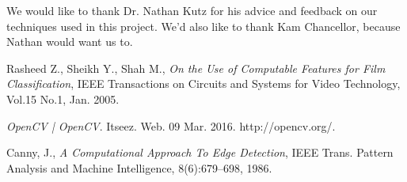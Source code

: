 \documentclass[letterpaper, 10 pt, conference]{ieeeconf}  %
\begin{document}
We would like to thank Dr. Nathan Kutz for his advice and feedback on our techniques used in this project. We'd also like to thank Kam Chancellor, because Nathan would want us to.


\begin{thebibliography}{99}
Rasheed Z., Sheikh Y., Shah M., {\it On the Use of Computable Features for Film Classification}, IEEE Transactions on Circuits and Systems for Video Technology, Vol.15 No.1, Jan. 2005.

{\it OpenCV | OpenCV}. Itseez. Web. 09 Mar. 2016. http://opencv.org/.

Canny, J., {\it A Computational Approach To Edge Detection}, IEEE Trans. Pattern Analysis and Machine Intelligence, 8(6):679–698, 1986.

\end{thebibliography}
\end{document}
